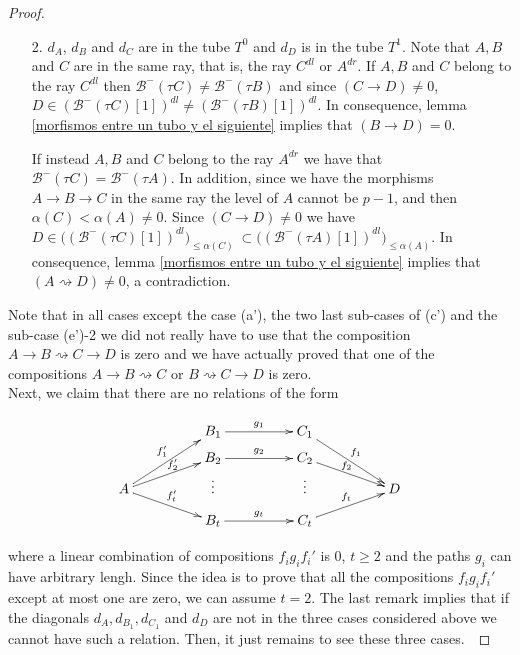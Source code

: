 \documentclass{amsart}
\theoremstyle{plain}
\theoremstyle{definition}
\begin{document}
\begin{proof}
\begin{itemize}
\begin{itemize}
        \item [2.]  $d_A$, $d_B$  and $d_C$ are in the tube $T^0$ and $d_D$ is in the tube $T^1$. Note that $A,B$ and $C$ are in the same ray, that is,  the ray  $C^{dl}$ or $A^{dr}$. If $A,B$ and $C$ belong to the ray
$C^{dl}$ then $\mathcal{B}^-(\tau C)\neq \mathcal{B}^-(\tau B)$
and since  $(C\rightarrow D)\neq 0$, $D\in (\mathcal{B}^-(\tau
C)[1])^{dl}\neq (\mathcal{B}^-(\tau B)[1])^{dl} $. In consequence,  lemma \ref{morfismos entre un tubo y el siguiente} implies that $(B\rightarrow D)=0$.

If instead  $A,B$ and $C$ belong to the ray  $A^{dr}$ we have that
$\mathcal{B}^-(\tau C)=\mathcal{B}^-(\tau A)$. In addition, since we have the morphisms  $A\rightarrow B \rightarrow C$ in the same ray  the level of  $A$ cannot be $p-1$, and then $\alpha(C)< \alpha(A)\neq 0$.   Since  $(C\rightarrow D)\neq 0$ we have   $D\in \bigl((\mathcal{B}^-(\tau C)[1])^{dl}\bigr)_{\leq \alpha(C)} \ \subset
\bigl ((\mathcal{B}^-(\tau A)[1])^{dl}\bigr)_{\leq \alpha(A)}$. In consequence,  lemma \ref{morfismos entre un tubo y el siguiente} implies that   $(A\rightsquigarrow D)\neq 0$, a contradiction.\\

      \end{itemize}

\end{itemize}

Note that in all cases except the case (a'), the two last sub-cases of (c') and the sub-case  (e')-2 we did not really have to use that the composition $A\rightarrow B\rightsquigarrow C \rightarrow D$ is zero and we have actually proved that one of the  compositions $A\rightarrow B\rightsquigarrow C$ or $B\rightsquigarrow C \rightarrow D$ is zero.\\

Next,  we claim that there are no relations of the form

\[\xymatrix@R=0.4pc@C=4pc{
& B_1 \ar[r]^{g_1} & C_1\ar[ddr]^{   f_1}&\\
& B_2 \ar[r]^{g_2} & C_2\ar[dr]^{f_2 \hspace{.5cm}}&\\
A \ar[uur]^{f_1'}\ar[ur]^{ \hspace{.6cm}   f_2'}\ar[dr]^{f_t'}&\vdots & \vdots & D\\
& B_t \ar[r]^{g_t} & C_t\ar[ur]^{f_t}&\\
}\]

where a linear combination of  compositions  $f_i g_i f_i'$ is $0$,   $t\geq 2$ and the paths $g_i$ can have arbitrary lengh. Since the idea is to prove that all the compositions $f_i g_i f_i'$ except at most one are zero,  we can assume  $t=2$.
The last remark  implies that if the diagonals $d_A,d_{B_1},d_{C_1}$ and $d_D$  are not in the three cases considered above we cannot have such a relation. Then, it just remains to see these three cases.\


\end{proof}
\end{document}
